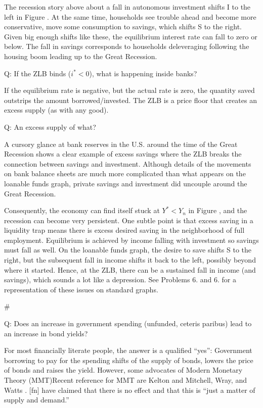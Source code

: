 ﻿\documentclass[oneside]{book}
\begin{document}
The recession story above about a fall in autonomous investment shifts I to the left in
Figure . At the same time, households see trouble ahead and become more
conservative, move some consumption to savings, which shifts S to the
right. Given big enough shifts like these, the equilibrium interest rate
can fall to zero or below. The fall in savings corresponds to households
deleveraging following the housing boom leading up to the Great Recession.

Q: If the ZLB binds ($i^{\ast }<0$), what is happening inside banks?

If the equilibrium rate is negative, but the actual rate is zero, the
quantity saved outstrips the amount borrowed/invested. The ZLB is a price
floor that creates an excess supply (as with any good).

Q: An excess supply of what?

A cursory glance at bank reserves in the U.S. around the time of the Great Recession
shows a clear example of excess savings where the ZLB breaks the connection between savings and investment. Although details of the movements on bank balance sheets are much more complicated than what appears on the loanable funds graph, private savings and investment did uncouple around the Great Recession.

Consequently, the economy can find itself stuck at $Y^{\ast }<Y_{n}$ in
Figure , and the recession can become very persistent. One subtle point is that excess saving in a liquidity trap
means there is excess desired saving in the neighborhood of full
employment. Equilibrium is achieved by income falling with
investment so savings must fall as well. On the loanable funds graph, the
desire to save shifts S to the right, but the subsequent fall in income
shifts it back to the left, possibly beyond where it started. Hence,
at the ZLB, there can be a sustained fall in income (and savings), which
sounds a lot like a depression. See Problems 6. and 6. for a representation of these issues on standard graphs.



#



Q: Does an increase in government spending (unfunded, ceteris paribus)
lead to an increase in bond yields?

For most financially literate people, the answer is a
qualified ``yes'': Government borrowing to pay for the spending shifts of
the supply of bonds, lowers the price of bonds and raises the
yield. However, some advocates of Modern Monetary Theory (MMT)Recent reference for MMT are Kelton  and Mitchell, Wray, and Watts . [fn] have
claimed that there is no effect and that this is ``just a matter of supply and
demand.''
\end{document}
